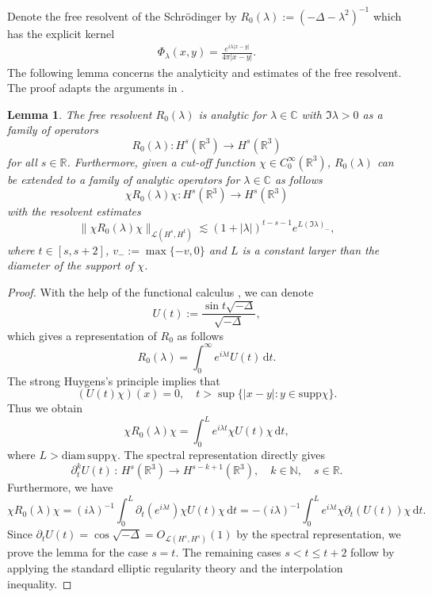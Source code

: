\documentclass[reqno, 12pt]{amsart}
\newtheorem{Le}{Lemma}[section]
\numberwithin{equation}{section}
\begin{document}
Denote the free resolvent of the Schr\"odinger by ${R}_0(\lambda):=(-\Delta-\lambda^2)^{-1}$ which has the explicit kernel 
\begin{align} 
	\Phi_\lambda(x,y)=
	\frac{e^{i\lambda|x-y|}}{4\pi |x-y| }.
	\label{4.2}
\end{align}  The following lemma concerns the analyticity and estimates of the free resolvent. The proof adapts the arguments in 
\cite{dyatlov2019mathematical}.
\begin{Le}\label{Lem4.1}
	The free resolvent $R_0(\lambda)$ is analytic for $\lambda \in \mathbb{C}$ with $\Im \lambda>0$ as a family of operators \[
	R_0(\lambda): H^s(\mathbb{R}^3) \to H^s(\mathbb{R}^3)
	\] for all $s \in \mathbb{R}$. Furthermore, given a cut-off function $\chi \in C_0^\infty(\mathbb{R}^3)$, ${R}_0(\lambda)$ can be extended to a family of analytic operators for $\lambda \in \mathbb{C}$ as follows \[
	\chi R_0(\lambda) \chi : H^s(\mathbb{R}^3) \to H^s(\mathbb{R}^3)
	\] with the resolvent estimates 
	\begin{equation*}
		\|\chi R_0(\lambda) \chi \|_{\mathcal{L}(H^s,H^t)} \lesssim (1+|\lambda|)^{t-s-1}e^{L (\Im \lambda)_-},
	\end{equation*} where $t\in [s,s+2]$, $v_-:=\max\{-v,0\}$ and $L$ is a constant larger than the diameter of the support of $\chi$.
\end{Le}
\begin{proof}
	With the help of the functional calculus \cite[Appendix B.2]{dyatlov2019mathematical}, we can denote \[
	U(t):=\frac{\sin t\sqrt{-\Delta}}{\sqrt{-\Delta}}, 
	\] which gives a representation of $R_0$ as follows
	\[
	R_0(\lambda)=\int_0^\infty e^{i\lambda t} U(t)\,\mathrm{d}t.
	\] The strong Huygens's principle implies that \[
	(U(t) \chi)(x)=0,\quad t>\sup\{|x-y|:y \in \text{supp} \chi\}.
	\] Thus we obtain \[
	\chi  R_0(\lambda) \chi =\int_0^L e^{i\lambda t} \chi U(t) \chi \,\mathrm{d}t,
	\] where $L> \text{diam}\,\text{supp} \chi$.
	The spectral representation \cite[Appendix B.1]{dyatlov2019mathematical} directly
	gives \[
	\partial_t^k U(t) \,:\, H^s(\mathbb{R}^3) \to H^{s-k+1}(\mathbb{R}^3),\quad k \in \mathbb{N},\quad s \in \mathbb{R}.
	\]  Furthermore, we have \[
	\chi  R_0(\lambda) \chi=(i\lambda)^{-1}\int_0^L  \partial_t(e^{i\lambda t}) \chi U(t) \chi \,\mathrm{d}t=-(i\lambda)^{-1}\int_0^L  e^{i\lambda t} \chi  \partial_t(U(t)) \chi \,\mathrm{d}t.
	\] Since $\partial_tU(t)=\cos{\sqrt{-\Delta}}=O_{\mathcal{L}(H^s, H^s)}(1)$ by the spectral representation, we prove the lemma for the case $s=t$. 
	The remaining cases $s<t \le t+2$ follow by applying the standard elliptic regularity theory and the interpolation inequality.
\end{proof}
\end{document}
